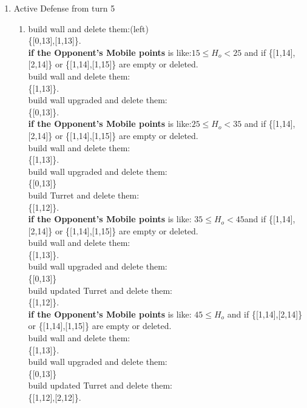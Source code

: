 \documentclass[12pt]{article}
\begin{document}
\begin{enumerate}
\begin{enumerate}
\end{enumerate}
\item Active Defense from turn 5
\begin{enumerate}
\item build wall and delete them:(left)\\ \{[0,13],[1,13]\}. \\ \textbf{if the Opponent's Mobile points} is like:$15 \leq H_o < 25$ and if \{[1,14],[2,14]\} or \{[1,14],[1,15]\} are empty or deleted. \\ build wall and delete them:\\ \{[1,13]\}.\\  build wall upgraded and delete them:\\ \{[0,13]\}.\\ \textbf{if the Opponent's Mobile points} is like:$25 \leq H_o < 35$  and if \{[1,14],[2,14]\} or \{[1,14],[1,15]\} are empty or deleted. \\ build wall and delete them:\\ \{[1,13]\}.\\  build wall upgraded and delete them:\\ \{[0,13]\}\\build Turret and delete them:\\ \{[1,12]\}.\\ \textbf{if the Opponent's Mobile points} is like: $35 \leq H_o < 45$and if \{[1,14],[2,14]\} or \{[1,14],[1,15]\} are empty or deleted. \\ build wall and delete them:\\ \{[1,13]\}.\\  build wall upgraded and delete them:\\ \{[0,13]\}\\build updated Turret and delete them:\\ \{[1,12]\}.\\ \textbf{if the Opponent's Mobile points} is like: $45 \leq H_o $ and if \{[1,14],[2,14]\} or \{[1,14],[1,15]\} are empty or deleted. \\ build wall and delete them:\\ \{[1,13]\}.\\  build wall upgraded and delete them:\\ \{[0,13]\}\\build updated Turret and delete them:\\ \{[1,12],[2,12]\}.

\end{enumerate}
\end{enumerate}
\end{document}
